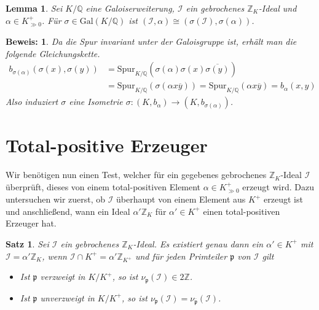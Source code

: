 \documentclass[12pt,a4paper,halfparskip,headsepline,bibtotocnumbered]{scrreprt}
\theoremstyle{nummermitklammern}
\newtheorem{satz}[defsatzusw]{Satz}
\newtheorem{lemma}[defsatzusw]{Lemma}
\theoremstyle{nonumberbreak}
\newtheorem{beweis}{Beweis:}
\newcommand{\Z}{\mathbb{Z}}
\newcommand{\Q}{\mathbb{Q}}
\newcommand{\I}{\mathcal{I}}
\newcommand{\p}{\mathfrak{p}}
\begin{document}
\begin{framed}
	\begin{lemma}
		Sei $K / \Q$ eine Galoiserweiterung, $\I$ ein gebrochenes $\Z_K$-Ideal und $\alpha \in K^+_{\gg 0}$. Für $\sigma \in \text{Gal}(K/\Q)$ ist $(\I, \alpha) \cong \left( \sigma(\I), \sigma(\alpha) \right)$.
	\end{lemma}
\end{framed}

\begin{beweis}
	Da die Spur invariant unter der Galoisgruppe ist, erhält man die folgende Gleichungskette.
	\begin{align*}
		b_{\sigma(\alpha)} (\sigma(x), \sigma(y)) &= \text{Spur}_{K/\Q} \left( \sigma(\alpha) \sigma(x) \overline{\sigma(y)}\right)\\
		&= \text{Spur}_{K/\Q} \left( \sigma\left( \alpha x \overline{y} \right) \right) = \text{Spur}_{K/\Q} \left( \alpha x \overline{y} \right) = b_\alpha (x,y)
	\end{align*}
	Also induziert $\sigma$ eine Isometrie $\sigma : (K, b_\alpha) \rightarrow (K, b_{\sigma(\alpha)})$.
\end{beweis}

\section{Total-positive Erzeuger}

Wir benötigen nun einen Test, welcher für ein gegebenes gebrochenes $\Z_K$-Ideal $\I$ überprüft, dieses von einem total-positiven Element $\alpha \in K^+_{\gg 0}$ erzeugt wird. Dazu untersuchen wir zuerst, ob $\I$ überhaupt von einem Element aus $K^+$ erzeugt ist und anschließend, wann ein Ideal $\alpha'\Z_K$ für $\alpha' \in K^+$ einen total-positiven Erzeuger hat.

\begin{framed}
	\begin{satz}
		Sei $\I$ ein gebrochenes $\Z_K$-Ideal. Es existiert genau dann ein $\alpha' \in K^+$ mit $\I = \alpha' \Z_K$, wenn $\I \cap K^+ = \alpha' \Z_{K^+}$ und für jeden Primteiler $\p$ von $\I$ gilt
		\begin{itemize}
			\item Ist $\p$ verzweigt in $K / K^+$, so ist $\nu_\p(\I) \in 2\Z$.
			\item Ist $\p$ unverzweigt in $K / K^+$, so ist $\nu_\p(\I) = \nu_{\overline{\p}}(\I)$.
		\end{itemize}
	\end{satz}
\end{framed} 
\end{document}
